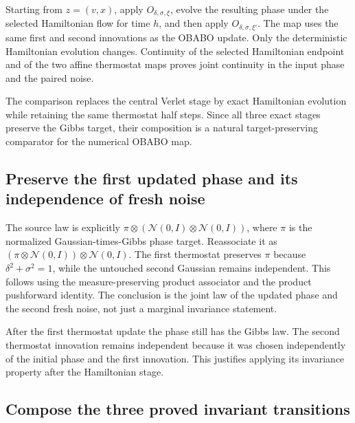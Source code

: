 \documentclass[11pt,a4paper]{report}
\begin{document}
Starting from \(z=(v,x)\), apply \(O_{\delta,\sigma,\xi}\), evolve the resulting phase under the selected Hamiltonian flow for time \(h\), and then apply \(O_{\delta,\sigma,\xi\prime}\). The map uses the same first and second innovations as the OBABO update. Only the deterministic Hamiltonian evolution changes. Continuity of the selected Hamiltonian endpoint and of the two affine thermostat maps proves joint continuity in the input phase and the paired noise.



The comparison replaces the central Verlet stage by exact Hamiltonian evolution while retaining the same thermostat half steps. Since all three exact stages preserve the Gibbs target, their composition is a natural target-preserving comparator for the numerical OBABO map.

\subsection{\texorpdfstring{Preserve the first updated phase and its independence of fresh noise}{Preserve the first updated phase and its independence of fresh noise}}
\label{report-step-KineticLangevin-ExactOBABO-lean-2}


The source law is explicitly \(\pi\otimes(\mathcal N(0,I)\otimes\mathcal N(0,I))\), where \(\pi\) is the normalized Gaussian-times-Gibbs phase target. Reassociate it as \((\pi\otimes\mathcal N(0,I))\otimes\mathcal N(0,I)\). The first thermostat preserves \(\pi\) because \(\delta^2+\sigma^2=1\), while the untouched second Gaussian remains independent. This follows using the measure-preserving product associator and the product pushforward identity. The conclusion is the joint law of the updated phase and the second fresh noise, not just a marginal invariance statement.



After the first thermostat update the phase still has the Gibbs law. The second thermostat innovation remains independent because it was chosen independently of the initial phase and the first innovation. This justifies applying its invariance property after the Hamiltonian stage.

\subsection{\texorpdfstring{Compose the three proved invariant transitions}{Compose the three proved invariant transitions}}
\label{report-step-KineticLangevin-ExactOBABO-lean-3}
\end{document}
